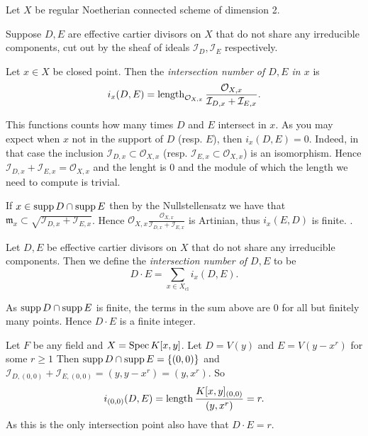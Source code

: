
Let $X$ be regular Noetherian connected scheme of dimension 2. 
\begin{definition}
	Suppose $D, E$ are effective cartier divisors on $X$ that do not share any irreducible components, cut out by the sheaf of ideals $\mathcal{I} _D, \mathcal{I} _E$ respectively.

	Let $x \in X$ be closed point. Then the \emph{intersection number of $D, E$ in $x$} is \[
		i_x(D, E) = \operatorname{length}_{\mathcal{O}_{X, x}} \frac{\mathcal{O}_{X, x}}{\mathcal{I}_{D,x} + \mathcal{I}_{E,x}} 
	.\]  
\end{definition}

This functions counts how many times $ D$ and $E$ intersect in $x$. 
As you may expect when  $x$ not in the support of $D$ (resp. $E$), then $i_x(D, E) = 0$. 
Indeed, in that case the inclusion $\mathcal{I}_{D, x} \subset  \mathcal{O}_{X, x}$ (resp. $\mathcal{I} _{E, x}\subset \mathcal{O}_{X,x}$) is an isomorphism. 
Hence $\mathcal{I}_{D, x} + \mathcal{I} _{E, x} = \mathcal{O}_{X, x}$ and the lenght is $0$ and the module of which the length we need to compute is trivial. 

If $x \in \operatorname{supp} D \cap \operatorname{supp} E$ then by the Nullstellensatz we have that $\mathfrak{m} _x \subset  \sqrt{\mathcal{I} _{D, x} + \mathcal{I} _{E, x}} $. 
Hence ${\mathcal{O}_{X, x}} \frac{\mathcal{O}_{X, x}}{\mathcal{I}_{D,x} + \mathcal{I}_{E,x}}$ is Artinian, thus $i_x(E, D)$ is finite. 
. 

\begin{definition}\label{def:intersection_number_effective}
	Let $D, E$ be effective cartier divisors on $X$ that do not share any irreducible components.
	Then we define the \emph{intersection number of $D, E$} to be \[
		D\cdot E = \sum_{x \in X_\text{cl} }i_x (D, E)
	.\] 
\end{definition}
As $\operatorname{supp} D \cap \operatorname{supp} E$ is finite, the terms in the sum above are $0$ for all but finitely many points. Hence $D\cdot E$ is a finite integer. 
\begin{example}
	Let $F$ be any field and $X = \operatorname{Spec} K[x, y]$. 
	Let  $D = V(y)$ and $E = V(y - x^r)$ for some $r \ge 1$
	Then  $\operatorname{supp} D \cap \operatorname{supp} E = \{(0, 0)\} $ and $\mathcal{I} _{D, (0,0)} + \mathcal{I} _{E, (0,0)} = (y, y-x^r) = (y, x^r)$.
	So \[
		i_{(0,0)}(D, E) = \operatorname{length} \frac{K[x, y]_{(0, 0)}}{(y, x^{r})} = r
	.\] 
	As this is the only intersection point also have that $D\cdot E = r$. 
\end{example}

